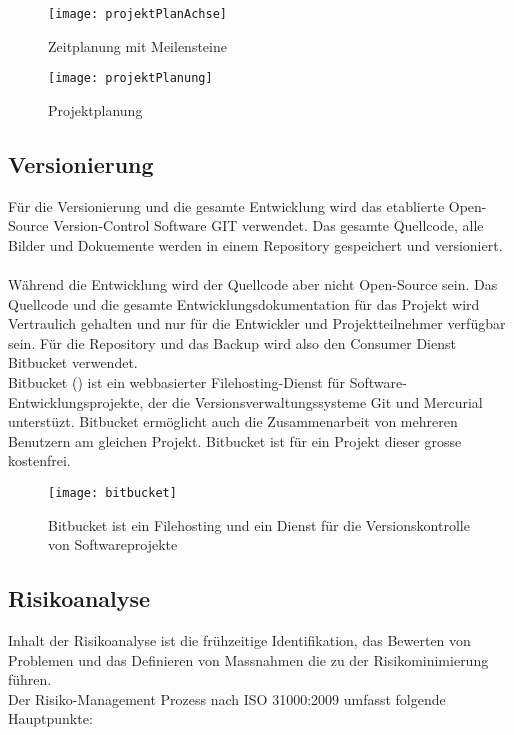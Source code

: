 \begin{figure}[htb!]
	\begin{center}
		\texttt{[image: projektPlanAchse]}
		\caption[Projektplanung Meilensteine]{Zeitplanung mit Meilensteine}
		\label{fig:projektPlanungAchse}
	\end{center}
\end{figure}


\begin{figure}[htb!]
	\begin{center}
		\texttt{[image: projektPlanung]}
		\caption[Projektplanung]{Projektplanung}
		\label{fig:projektPlanung}
	\end{center}
\end{figure}

\subsection{Versionierung}
Für die Versionierung und die gesamte Entwicklung wird das etablierte Open-Source Version-Control Software GIT verwendet. Das gesamte Quellcode, alle Bilder und Dokuemente werden in einem Repository gespeichert und versioniert.
\\
\\
Während die Entwicklung wird der Quellcode aber nicht Open-Source sein. Das Quellcode und die gesamte Entwicklungsdokumentation für das Projekt wird Vertraulich gehalten und nur für die Entwickler und Projektteilnehmer verfügbar sein. Für die Repository und das Backup wird also den Consumer Dienst Bitbucket verwendet.
\\
Bitbucket () ist ein webbasierter Filehosting-Dienst für Software-Entwicklungsprojekte, der die Versionsverwaltungssysteme Git und Mercurial unterstüzt. Bitbucket ermöglicht auch die Zusammenarbeit von mehreren Benutzern am gleichen Projekt. Bitbucket ist für ein Projekt dieser grosse kostenfrei.
\begin{figure}[htb!]
	\begin{center}
		\texttt{[image: bitbucket]}
		\caption[Bitbucket ist ein Filehosting und ein Dienst für die Versionskontrolle von Softwareprojekte]{Bitbucket ist ein Filehosting und ein Dienst für die Versionskontrolle von Softwareprojekte}
		\label{fig:bitbucket}
	\end{center}
\end{figure}

\subsection{Risikoanalyse}
Inhalt der Risikoanalyse ist die frühzeitige Identifikation, das Bewerten von Problemen und das Definieren von Massnahmen die zu der Risikominimierung führen.
\\
Der Risiko-Management Prozess nach ISO 31000:2009 umfasst folgende Hauptpunkte: 

